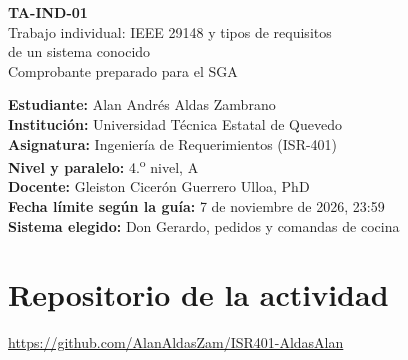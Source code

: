 \documentclass[11pt,a4paper]{article}
\begin{document}
\begin{center}
{\Large\bfseries TA-IND-01}\\[6pt]
{\large Trabajo individual: IEEE 29148 y tipos de requisitos\\[3pt]
{\normalsize de un sistema conocido}}\\[6pt]
Comprobante preparado para el SGA
\end{center}
\noindent\textbf{Estudiante:} Alan Andrés Aldas Zambrano\\
\textbf{Institución:} Universidad Técnica Estatal de Quevedo\\
\textbf{Asignatura:} Ingeniería de Requerimientos (ISR-401)\\
\textbf{Nivel y paralelo:} 4.\textsuperscript{o} nivel, A\\
\textbf{Docente:} Gleiston Cicerón Guerrero Ulloa, PhD\\

\textbf{Fecha límite según la guía:} 7 de noviembre de 2026, 23:59\\
\textbf{Sistema elegido:} Don Gerardo, pedidos y comandas de cocina

\section*{Repositorio de la actividad}
\url{https://github.com/AlanAldasZam/ISR401-AldasAlan}
\end{document}
